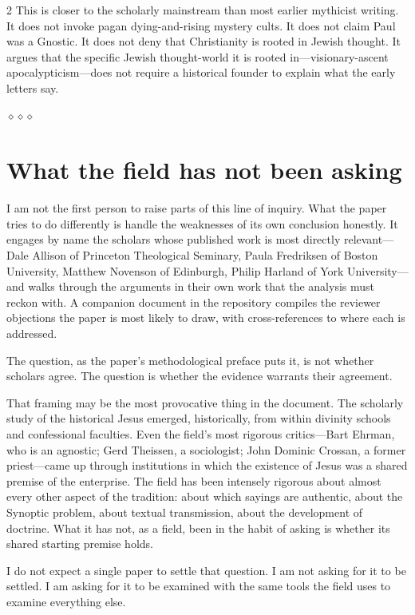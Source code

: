 \documentclass[11pt,oneside]{article}
\newcommand{\sectbreak}{%
  \par\vspace{1.3em}
  \noindent\hfil
  {\color{accent}$\diamond$\hspace{0.5em}$\diamond$\hspace{0.5em}$\diamond$}%
  \hfil\par\vspace{1em}}
\begin{document}
\begin{multicols}{2}
This is closer to the scholarly mainstream than most earlier
mythicist writing.  It does not invoke pagan dying-and-rising
mystery cults.  It does not claim Paul was a Gnostic.  It does not
deny that Christianity is rooted in Jewish thought.  It argues that
the specific Jewish thought-world it is rooted in---visionary-ascent
apocalypticism---does not require a historical founder to explain
what the early letters say.

\sectbreak
\section*{What the field has not been asking}

I am not the first person to raise parts of this line of inquiry.
What the paper tries to do differently is handle the weaknesses of
its own conclusion honestly.  It engages by name the scholars whose
published work is most directly relevant---Dale Allison of Princeton
Theological Seminary, Paula Fredriksen of Boston University, Matthew
Novenson of Edinburgh, Philip Harland of York University---and
walks through the arguments in their own work that the analysis
must reckon with.  A companion document in the repository compiles
the reviewer objections the paper is most likely to draw, with
cross-references to where each is addressed.

The question, as the paper's methodological preface puts it, is not
whether scholars agree.  The question is whether the evidence
warrants their agreement.

That framing may be the most provocative thing in the document.
The scholarly study of the historical Jesus emerged, historically,
from within divinity schools and confessional faculties.  Even the
field's most rigorous critics---Bart Ehrman, who is an agnostic;
Gerd Theissen, a sociologist; John Dominic Crossan, a former
priest---came up through institutions in which the existence of
Jesus was a shared premise of the enterprise.  The field has been
intensely rigorous about almost every other aspect of the
tradition: about which sayings are authentic, about the Synoptic
problem, about textual transmission, about the development of
doctrine.  What it has not, as a field, been in the habit of asking
is whether its shared starting premise holds.

I do not expect a single paper to settle that question.  I am not
asking for it to be settled.  I am asking for it to be examined
with the same tools the field uses to examine everything else.


\end{multicols}
\end{document}
